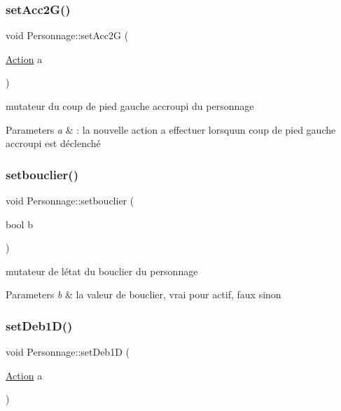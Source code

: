 \subsubsection{\texorpdfstring{set\+Acc2\+G()}{setAcc2G()}}
{\footnotesize\ttfamily void Personnage\+::set\+Acc2G (\begin{DoxyParamCaption}\item[{\hyperlink{class_action}{Action}}]{a }\end{DoxyParamCaption})}



mutateur du coup de pied gauche accroupi du personnage 


\begin{DoxyParams}{Parameters}
{\em a} & \+: la nouvelle action a effectuer lorsqu\textquotesingle{}un coup de pied gauche accroupi est déclenché \\
\hline
\end{DoxyParams}
\mbox{\label{class_personnage_a15950ba47d8b699b3768e13aaace6631}} 
\subsubsection{\texorpdfstring{setbouclier()}{setbouclier()}}
{\footnotesize\ttfamily void Personnage\+::setbouclier (\begin{DoxyParamCaption}\item[{bool}]{b }\end{DoxyParamCaption})}



mutateur de l\textquotesingle{}état du bouclier du personnage 


\begin{DoxyParams}{Parameters}
{\em b} & la valeur de bouclier, vrai pour actif, faux sinon \\
\hline
\end{DoxyParams}
\mbox{\label{class_personnage_a22db8a02ac16afc4853ec0a5b2596f8f}} 
\subsubsection{\texorpdfstring{set\+Deb1\+D()}{setDeb1D()}}
{\footnotesize\ttfamily void Personnage\+::set\+Deb1D (\begin{DoxyParamCaption}\item[{\hyperlink{class_action}{Action}}]{a }\end{DoxyParamCaption})}



